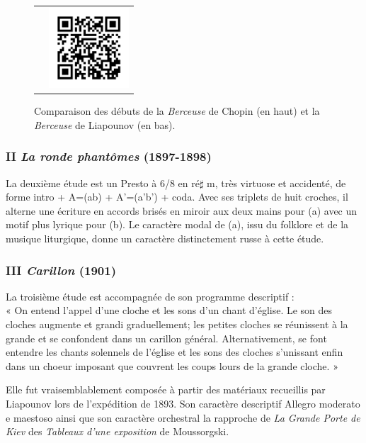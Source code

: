 \begin{figure}[!p]
\begin{bigcenter}
\begin{tabular}{lr}
      &
      \includegraphics[width=3cm, keepaspectratio]{op11-qr.png}
    \end{tabular}
  \end{bigcenter}
  \caption{\label{op11-i}Comparaison des débuts de la \emph{Berceuse} de Chopin (en haut) et la \emph{Berceuse} de Liapounov (en bas).}
\end{figure}

\subsubsection{II \emph{La ronde phantômes} (1897-1898)}

La deuxième étude est un Presto à 6/8 en ré$\sharp$ m, très virtuose et accidenté, de forme intro + A=(ab) + A'=(a'b') + coda. Avec ses triplets de huit croches, il alterne une écriture en accords brisés en miroir aux deux mains pour (a) avec un motif plus lyrique pour (b). Le caractère modal de (a), issu du folklore et de la musique liturgique, donne un caractère distinctement russe à cette étude.

\subsubsection{III \emph{Carillon} (1901)}

La troisième étude est accompagnée de son programme descriptif :\\

« On entend l'appel d'une cloche et les sons d'un chant d'église. Le son des cloches augmente et grandi graduellement; les petites cloches se réunissent à la grande et se confondent dans un carillon général. Alternativement, se font entendre les chants solennels de l'église et les sons des cloches s’unissant enfin dans un choeur imposant que couvrent les coups lours de la grande cloche. »

Elle fut vraisemblablement composée à partir des matériaux recueillis par Liapounov lors de l'expédition de 1893. Son caractère descriptif Allegro moderato e maestoso ainsi que son caractère orchestral la rapproche de \emph{La Grande Porte de Kiev} des \emph{Tableaux d'une exposition} de Moussorgski.

